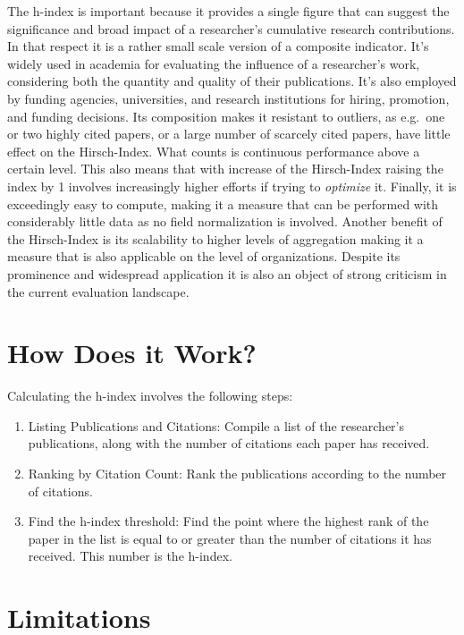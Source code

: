 \documentclass[
  letterpaper,
]{scrreprt}
\providecommand{\tightlist}{%
  \setlength{\itemsep}{0pt}\setlength{\parskip}{0pt}}
\begin{document}
The h-index is important because it provides a single figure that can
suggest the significance and broad impact of a researcher's cumulative
research contributions. In that respect it is a rather small scale
version of a composite indicator. It's widely used in academia for
evaluating the influence of a researcher's work, considering both the
quantity and quality of their publications. It's also employed by
funding agencies, universities, and research institutions for hiring,
promotion, and funding decisions. Its composition makes it resistant to
outliers, as e.g.~one or two highly cited papers, or a large number of
scarcely cited papers, have little effect on the Hirsch-Index. What
counts is continuous performance above a certain level. This also means
that with increase of the Hirsch-Index raising the index by 1 involves
increasingly higher efforts if trying to \emph{optimize} it. Finally, it
is exceedingly easy to compute, making it a measure that can be
performed with considerably little data as no field normalization is
involved. Another benefit of the Hirsch-Index is its scalability to
higher levels of aggregation making it a measure that is also applicable
on the level of organizations. Despite its prominence and widespread
application it is also an object of strong criticism in the current
evaluation landscape.

\section{How Does it Work?}\label{how-does-it-work-6}

Calculating the h-index involves the following steps:

\begin{enumerate}
\def\labelenumi{\arabic{enumi}.}
\tightlist
\item
  Listing Publications and Citations: Compile a list of the researcher's
  publications, along with the number of citations each paper has
  received.
\item
  Ranking by Citation Count: Rank the publications according to the
  number of citations.
\item
  Find the h-index threshold: Find the point where the highest rank of
  the paper in the list is equal to or greater than the number of
  citations it has received. This number is the h-index.
\end{enumerate}

\section{Limitations}\label{limitations-8}
\end{document}
